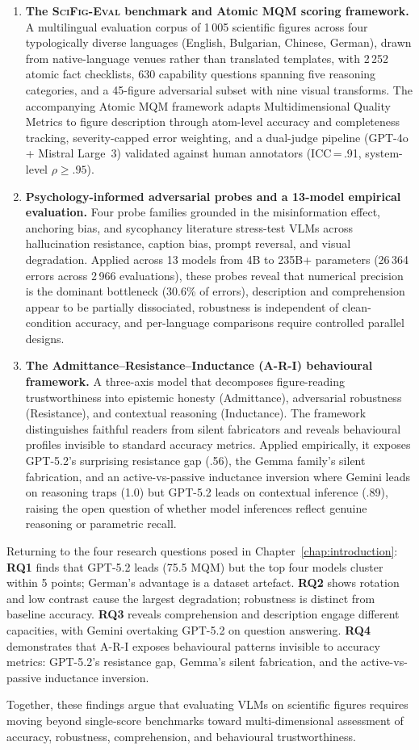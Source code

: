 \begin{enumerate}
\item \textbf{The \textsc{SciFig-Eval} benchmark and Atomic MQM scoring framework.}
  A multilingual evaluation corpus of 1\,005 scientific figures across four typologically diverse languages (English, Bulgarian, Chinese, German), drawn from native-language venues rather than translated templates, with 2\,252 atomic fact checklists, 630 capability questions spanning five reasoning categories, and a 45-figure adversarial subset with nine visual transforms.
  The accompanying Atomic MQM framework adapts Multidimensional Quality Metrics to figure description through atom-level accuracy and completeness tracking, severity-capped error weighting, and a dual-judge pipeline (GPT-4o + Mistral Large~3) validated against human annotators (ICC\,=\,.91, system-level $\rho\geq.95$).

\item \textbf{Psychology-informed adversarial probes and a 13-model empirical evaluation.}
  Four probe families grounded in the misinformation effect, anchoring bias, and sycophancy literature stress-test VLMs across hallucination resistance, caption bias, prompt reversal, and visual degradation.
  Applied across 13 models from 4B to 235B+ parameters (26\,364 errors across 2\,966 evaluations), these probes reveal that numerical precision is the dominant bottleneck (30.6\% of errors), description and comprehension appear to be partially dissociated, robustness is independent of clean-condition accuracy, and per-language comparisons require controlled parallel designs.

\item \textbf{The Admittance--Resistance--Inductance (A-R-I) behavioural framework.}
  A three-axis model that decomposes figure-reading trustworthiness into epistemic honesty (Admittance), adversarial robustness (Resistance), and contextual reasoning (Inductance).
  The framework distinguishes faithful readers from silent fabricators and reveals behavioural profiles invisible to standard accuracy metrics.
  Applied empirically, it exposes GPT-5.2's surprising resistance gap (.56), the Gemma family's silent fabrication, and an active-vs-passive inductance inversion where Gemini leads on reasoning traps (1.0) but GPT-5.2 leads on contextual inference (.89), raising the open question of whether model inferences reflect genuine reasoning or parametric recall.
\end{enumerate}

\bigskip
\noindent
Returning to the four research questions posed in Chapter~\ref{chap:introduction}:
\textbf{RQ1} finds that GPT-5.2 leads (75.5 MQM) but the top four models cluster within 5 points; German's advantage is a dataset artefact.
\textbf{RQ2} shows rotation and low contrast cause the largest degradation; robustness is distinct from baseline accuracy.
\textbf{RQ3} reveals comprehension and description engage different capacities, with Gemini overtaking GPT-5.2 on question answering.
\textbf{RQ4} demonstrates that A-R-I exposes behavioural patterns invisible to accuracy metrics: GPT-5.2's resistance gap, Gemma's silent fabrication, and the active-vs-passive inductance inversion.

Together, these findings argue that evaluating VLMs on scientific figures requires moving beyond single-score benchmarks toward multi-dimensional assessment of accuracy, robustness, comprehension, and behavioural trustworthiness.
